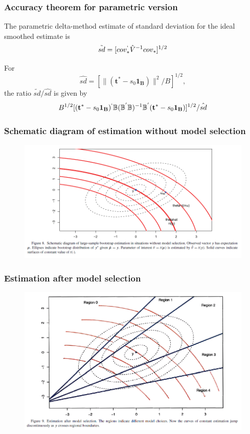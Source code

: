 \documentclass{beamer}
\begin{document}
\begin{frame}
\frametitle{Accuracy theorem for parametric version}
\begin{theorem}
The parametric delta-method estimate of standard deviation for the ideal smoothed estimate is
$$\tilde{sd} = [cov_* ^{`} \hat{V} ^{-1} cov_*]^{1/2}$$
\end{theorem}
\begin{corollary}
For $$ \hat{sd} = [ \| (\mathbf{t^*} - s_0 \mathbf{1_B}) \| ^2 /B ]^{1/2},$$
the ratio $\tilde{sd} / \hat{sd}$ is given by
$$ B^{1/2}[ (\mathbf{t^*} - s_0 \mathbf{1_B})^{`} \mathbb{B} (\mathbb{B}^{'}\mathbb{B})^{-1} \mathbb{B}^{'} (\mathbf{t^*} - s_0 \mathbf{1_B}) ]^{1/2}/ \hat{sd}$$
\end{corollary}
\end{frame}
\begin{frame}
\frametitle{Schematic diagram of estimation without model selection}
\begin{figure}[h]
\centering
\includegraphics[width=320bp, height= 200bp]{figure8_e.png}
\end{figure}
\end{frame}
\begin{frame}
\frametitle{Estimation after model selection}
\begin{figure}[h]
\centering
\includegraphics[width=300bp, height= 200bp]{figure9_e.png}
\end{figure}
\end{frame}
\end{document}
